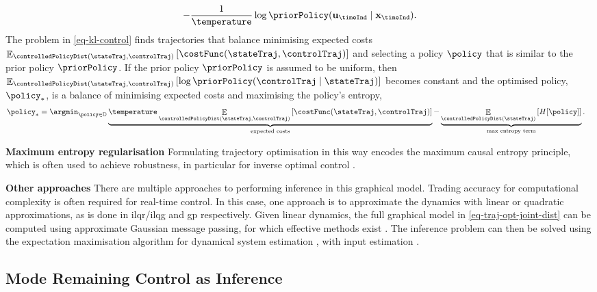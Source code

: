 \documentclass{mimosis-class/mimosis}
\numberwithin{equation}{chapter}
\DeclareMathOperator{\E}{\mathbb{E}}
\newcommand{\state}{\ensuremath{\mathbf{x}}}
\newcommand{\control}{\ensuremath{\mathbf{u}}}
\newcommand{\modeVar}{\ensuremath{\alpha}}
\begin{document}
{\begin{align}
- \frac{1}{\temperature} \log \priorPolicy(\control_\timeInd \mid \state_\timeInd).
\end{align}
The problem in \cref{eq-kl-control} finds trajectories that balance
minimising expected costs
\(\E_{\controlledPolicyDist(\stateTraj, \controlTraj)} \left[ \costFunc(\stateTraj, \controlTraj) \right]\)
and selecting a policy \(\policy\) that is similar to the prior policy \(\priorPolicy\).
If the prior policy \(\priorPolicy\) is assumed to be uniform, then
\(\E_{\controlledPolicyDist(\stateTraj, \controlTraj)} \left[ \log \priorPolicy(\controlTraj \mid \stateTraj) \right]\)
becomes constant and the optimised policy, \(\policy_*\), is a balance of minimising expected costs and
maximising the policy's entropy,
\begin{align} \label{eq-kl-control-uniform}
\policy_* &= \argmin_{\policy \in \mathbb{D}}
\underbrace{\temperature \E_{\controlledPolicyDist(\stateTraj, \controlTraj)}
\left[ \costFunc(\stateTraj, \controlTraj) \right]}_{\text{expected costs}}
- \underbrace{\E_{\controlledPolicyDist(\stateTraj)} \left[ H[\policy] \right]}_{\text{max entropy term}}.
\end{align}

\textbf{Maximum entropy regularisation} Formulating trajectory optimisation in this way encodes the
maximum causal entropy principle, which is often used to achieve robustness,
in particular for inverse optimal control \citep{ziebartModeling2010}.

\textbf{Other approaches} There are multiple approaches to performing inference in this graphical model.
Trading accuracy for computational complexity is often required for real-time control.
In this case, one approach is to approximate the dynamics with linear or
quadratic approximations, as is done in \acrshort{ilqr}/\acrshort{ilqg} and \acrshort{gp} respectively.
Given linear dynamics,
the full graphical model in \cref{eq-traj-opt-joint-dist} can be
computed using approximate Gaussian message passing, for which effective methods exist \citep{loeligerFactor2007}.
The inference problem can then be solved using the
expectation maximisation algorithm for dynamical system estimation
\citep{shumwayAPPROACH1982,ghahramaniLearning1999,schonSystem2011}, with input estimation \citep{watsonStochastic2021}.

\subsection{Mode Remaining Control as Inference \label{sec-traj-opt-inference}}
\label{sec:orgeee9946}
\renewcommand{\modeVarTraj}{\ensuremath{\bar{\bm\modeVar}}}

}
\end{document}
